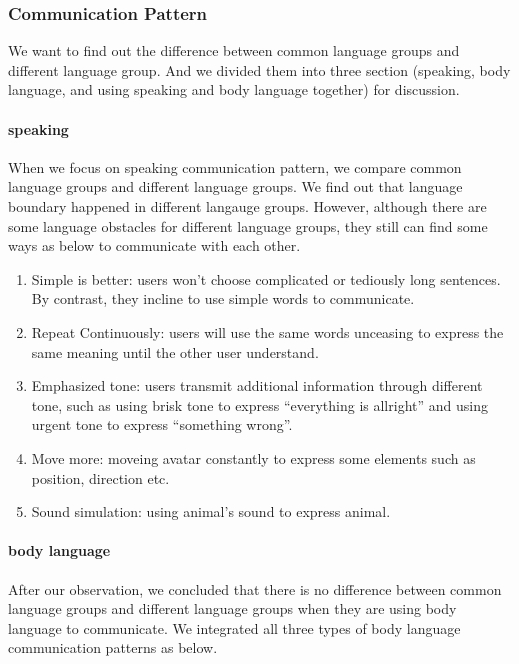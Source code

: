 
\subsubsection{Communication Pattern}
We want to find out the difference between common language groups and different language group. And we divided them into three section (speaking, body language, and using speaking and body language together) for discussion.

\paragraph{speaking}
When we focus on speaking communication pattern, we compare common language groups and different language groups. We find out that language boundary happened in different langauge groups. However, although there are some language obstacles for different language groups, they still can find some ways as below to communicate with each other.

\begin{enumerate}
  \item Simple is better: users won't choose complicated or tediously long sentences. By contrast, they incline to use simple words to communicate. 

  \item Repeat Continuously: users will use the same words unceasing to express the same meaning until the other user understand.
  
  \item Emphasized tone: users transmit additional information through different tone, such as using brisk tone to express ``everything is allright'' and using urgent tone to express ``something wrong''.
  
  \item Move more: moveing avatar constantly to express some elements such as position, direction etc.
  
  \item Sound simulation: using animal's sound to express animal.
\end{enumerate}

\paragraph{body language}
After our observation, we concluded that there is no difference between common language groups and different language groups when they are using body language to communicate. We integrated all three types of body language communication patterns as below.

